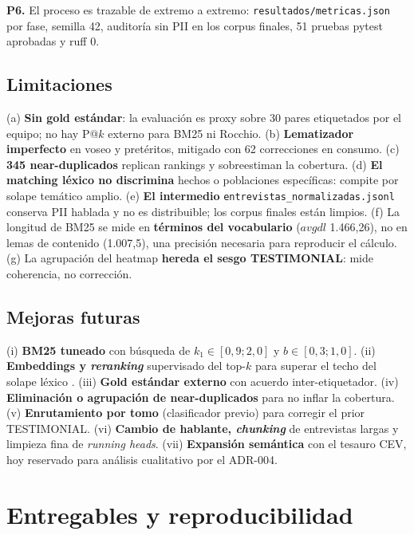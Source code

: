 \documentclass[11pt]{tg_usta}
\begin{document}
\textbf{P6.} El proceso es trazable de extremo a extremo: \texttt{resultados/metricas.json} por fase, semilla 42, auditoría sin PII en los corpus finales, 51 pruebas pytest aprobadas y ruff 0.

\subsection{Limitaciones}

(a) \textbf{Sin gold estándar}: la evaluación es proxy sobre 30 pares etiquetados por el equipo; no hay P@$k$ externo para BM25 ni Rocchio. (b) \textbf{Lematizador imperfecto} en voseo y pretéritos, mitigado con 62 correcciones en consumo. (c) \textbf{345 near-duplicados} replican rankings y sobreestiman la cobertura. (d) \textbf{El matching léxico no discrimina} hechos o poblaciones específicas: compite por solape temático amplio. (e) \textbf{El intermedio} \texttt{entrevistas\_normalizadas.jsonl} conserva PII hablada y no es distribuible; los corpus finales están limpios. (f) La longitud de BM25 se mide en \textbf{términos del vocabulario} ($avgdl$ 1.466,26), no en lemas de contenido (1.007,5), una precisión necesaria para reproducir el cálculo. (g) La agrupación del heatmap \textbf{hereda el sesgo TESTIMONIAL}: mide coherencia, no corrección.

\subsection{Mejoras futuras}

(i) \textbf{BM25 tuneado} con búsqueda de $k_1\in[0{,}9;2{,}0]$ y $b\in[0{,}3;1{,}0]$. (ii) \textbf{Embeddings y \textit{reranking}} supervisado del top-$k$ para superar el techo del solape léxico \cite{valentini2024messirve}. (iii) \textbf{Gold estándar externo} con acuerdo inter-etiquetador. (iv) \textbf{Eliminación o agrupación de near-duplicados} para no inflar la cobertura. (v) \textbf{Enrutamiento por tomo} (clasificador previo) para corregir el prior TESTIMONIAL. (vi) \textbf{Cambio de hablante, \textit{chunking}} de entrevistas largas y limpieza fina de \textit{running heads}. (vii) \textbf{Expansión semántica} con el tesauro CEV, hoy reservado para análisis cualitativo por el ADR-004.


\section{Entregables y reproducibilidad}\label{sec:entregables}
\end{document}
